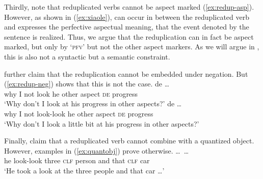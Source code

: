 Thirdly, \citet[319]{SuiHu2016} note that reduplicated verbs cannot be aspect marked (\ref{ex:redup-asp}).
\ea\label{ex:redup-asp}
\z\z
However, as shown in (\ref{ex:xiaole}),  can occur in between the reduplicated verb
 and expresses the perfective aspectual meaning, that the event denoted by the sentence is realized.
Thus, we argue that the reduplication can in fact be aspect marked,
but only by  `\textsc{pfv}' but not the other aspect markers.
As we will argue in , this is also not a syntactic but a semantic constraint.

\citet[319]{SuiHu2016} further claim that the reduplication cannot be embedded under negation. 
But (\ref{ex:redup-neg}) shows that this is not the case.
\ea \label{ex:redup-neg}
\ea \gll {}       de  \ldots\\
why I not look he other aspect \textsc{de} progress\\
\glt `Why don't I look at his progress in other aspects?'
\ex \gll  {}       de \ldots\\
why I not look-look he other aspect \textsc{de} progress \\ 
\glt `Why don't I look a little bit at his progress in other aspects?'
\z\z

Finally, \citet[322]{SuiHu2016} claim that a reduplicated verb cannot combine with a quantized object.
However, examples in (\ref{ex:quantobj}) prove otherwise.
\ea\label{ex:quantobj}
\ea\gll {} \ldots\,         \dots\\
he {} look-look three \textsc{clf} person and that \textsc{clf} car\\
\glt `He took a look at the three people and that car \ldots'

